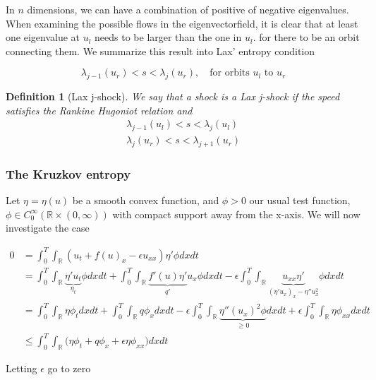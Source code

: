 \documentclass{article}
\newtheorem{definition}{Definition}[section]
\numberwithin{equation}{section}
\begin{document}
In $n$ dimensions, we can have a combination of positive of negative eigenvalues.  When examining the possible flows in the eigenvectorfield, it is clear that at least one eigenvalue at $u_l$ needs to be larger than the one in $u_l$. for there to be an orbit connecting them. We summarize this result into Lax' entropy condition

\begin{equation}
    \lambda_{j-1}(u_r) < s < \lambda_{j}(u_r), \quad \text{for orbits $u_l$ to $u_r$}
\end{equation}

\begin{definition}[Lax j-shock]
We say that a shock is a Lax j-shock if the speed satisfies the Rankine Hugoniot relation and 
\begin{align*}
    \lambda_{j-1}(u_l) < s < \lambda_{j}(u_l) \\
    \lambda_{j}(u_r) < s < \lambda_{j+1}(u_r)
\end{align*}
\end{definition}


\subsubsection{The Kruzkov entropy}\label{The Kruzkov entropy}
Let $\eta = \eta(u)$ be a smooth convex function, and $\phi > 0$ our usual test function, $\phi \in C_0^\infty(\mathbb{R} \times (0, \infty))$ with compact support away from the x-axis. We will now investigate the case

\begin{align}
   0 &= \int_0^T \int_{\mathbb{R}} (u_t + f(u)_x - \epsilon u_{xx}) \eta' \phi dxdt \\
   &= \int_0^T \int_{\mathbb{R}} \underbrace{\eta'u_t}_{\eta_t}  \phi dx dt + \int_0^T \int_{\mathbb{R}} \underbrace{f'(u)\eta'}_{q'} u_x \phi dxdt - \epsilon \int_0^T \int_{\mathbb{R}} \underbrace{ u_{xx}\eta'}_{(\eta'u_x)_x - \eta''u_x^2}\phi dxdt \\
   &= \int_0^T \int_{\mathbb{R}}  \eta \phi_t dx dt + \int_0^T \int_{\mathbb{R}} q \phi_x dxdt  - \epsilon \int_0^T \int_{\mathbb{R}} \underbrace{ \eta'' (u_x)^2 \phi}_{ \geq 0} dxdt +  \epsilon \int_0^T \int_{\mathbb{R}} \eta \phi_{xx} dxdt \\
   & \leq \int_0^T \int_{\mathbb{R}} \bigg ( \eta \phi_t + q\phi_x + \epsilon \eta \phi_{xx} \bigg ) dx dt 
\end{align}    

Letting $\epsilon$ go to zero
\end{document}
